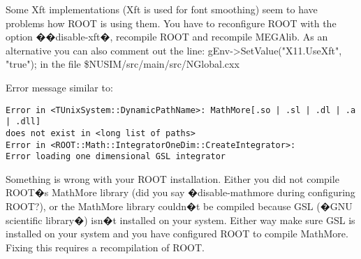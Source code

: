 Some Xft implementations (Xft is used for font smoothing) seem to have problems how ROOT is using them. You have to reconfigure ROOT with the option ��disable-xft�, recompile ROOT and recompile MEGAlib.
As an alternative you can also comment out the line:
gEnv->SetValue("X11.UseXft", "true");
in the file \$NUSIM/src/main/src/NGlobal.cxx


Error message similar to:
{\scriptsize \begin{verbatim}
Error in <TUnixSystem::DynamicPathName>: MathMore[.so | .sl | .dl | .a | .dll] 
does not exist in <long list of paths>
Error in <ROOT::Math::IntegratorOneDim::CreateIntegrator>: 
Error loading one dimensional GSL integrator
\end{verbatim}
}

Something is wrong with your ROOT installation. Either you did not compile ROOT�s MathMore library (did you say �disable-mathmore during configuring ROOT?), or the MathMore library couldn�t be compiled because GSL (�GNU scientific library�) isn�t installed on your system. Either way make sure GSL is installed on your system and you have configured ROOT to compile MathMore. Fixing this requires a recompilation of ROOT.


